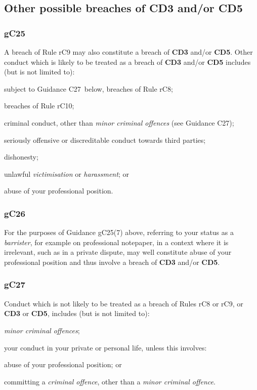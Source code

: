 \subsection{Other possible breaches of  \textbf{\textcolor{mygold}{CD3}} and/or  \textbf{\textcolor{mygold}{CD5}}}

\subsubsection{\color{darkgrey}gC25}

A breach of Rule rC9 may also constitute a breach of  \textbf{\textcolor{mygold}{CD3}} and/or  \textbf{\textcolor{mygold}{CD5}}.
Other conduct which is likely to be treated as a breach of  \textbf{\textcolor{mygold}{CD3}} and/or
 \textbf{\textcolor{mygold}{CD5}} includes (but is not limited to):
\begin{numlist}\item subject to Guidance C27~below, breaches of Rule rC8;
\item breaches of Rule rC10;
\item criminal conduct, other than \emph{minor criminal offences} (see
Guidance C27);
\item seriously offensive or discreditable conduct towards third parties;
\item dishonesty;
\item unlawful \emph{victimisation} or \emph{harassment}; or
\item abuse of your professional position.
\end{numlist}
\subsubsection{\color{darkgrey}gC26}

For the purposes of Guidance gC25(7) above, referring to your status as a
\emph{barrister}, for example on professional notepaper, in a context
where it is irrelevant, such as in a private dispute, may well
constitute abuse of your professional position and thus involve a breach
of  \textbf{\textcolor{mygold}{CD3}} and/or  \textbf{\textcolor{mygold}{CD5}}.

\subsubsection{\color{darkgrey}gC27}

Conduct which is not likely to be treated as a breach of Rules rC8 or
rC9, or  \textbf{\textcolor{mygold}{CD3}} or  \textbf{\textcolor{mygold}{CD5}}, includes (but is not limited to):
\begin{numlist}\item \emph{minor criminal offences};
\item your conduct in your private or personal life, unless this involves:
\begin{alphlist}\item abuse of your professional position; or
\item committing a \emph{criminal offence}, other than a \emph{minor
criminal offence}.\end{alphlist}
\end{numlist}

